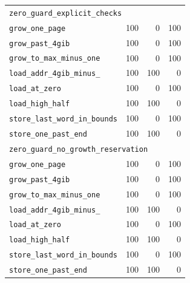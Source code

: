 {\begin{longtable}{lrrr}
\midrule
\multicolumn{4}{l}{\texttt{zero\_\allowbreak guard\_\allowbreak explicit\_\allowbreak checks}} \\
\quad \texttt{grow\_\allowbreak one\_\allowbreak page} & 100 & 0 & 100 \\
\quad \texttt{grow\_\allowbreak past\_\allowbreak 4gib} & 100 & 0 & 100 \\
\quad \texttt{grow\_\allowbreak to\_\allowbreak max\_\allowbreak minus\_\allowbreak one} & 100 & 0 & 100 \\
\quad \texttt{load\_\allowbreak addr\_\allowbreak 4gib\_\allowbreak minus\_\allowbreak 4} & 100 & 100 & 0 \\
\quad \texttt{load\_\allowbreak at\_\allowbreak zero} & 100 & 0 & 100 \\
\quad \texttt{load\_\allowbreak high\_\allowbreak half} & 100 & 100 & 0 \\
\quad \texttt{store\_\allowbreak last\_\allowbreak word\_\allowbreak in\_\allowbreak bounds} & 100 & 0 & 100 \\
\quad \texttt{store\_\allowbreak one\_\allowbreak past\_\allowbreak end} & 100 & 100 & 0 \\
\midrule
\multicolumn{4}{l}{\texttt{zero\_\allowbreak guard\_\allowbreak no\_\allowbreak growth\_\allowbreak reservation}} \\
\quad \texttt{grow\_\allowbreak one\_\allowbreak page} & 100 & 0 & 100 \\
\quad \texttt{grow\_\allowbreak past\_\allowbreak 4gib} & 100 & 0 & 100 \\
\quad \texttt{grow\_\allowbreak to\_\allowbreak max\_\allowbreak minus\_\allowbreak one} & 100 & 0 & 100 \\
\quad \texttt{load\_\allowbreak addr\_\allowbreak 4gib\_\allowbreak minus\_\allowbreak 4} & 100 & 100 & 0 \\
\quad \texttt{load\_\allowbreak at\_\allowbreak zero} & 100 & 0 & 100 \\
\quad \texttt{load\_\allowbreak high\_\allowbreak half} & 100 & 100 & 0 \\
\quad \texttt{store\_\allowbreak last\_\allowbreak word\_\allowbreak in\_\allowbreak bounds} & 100 & 0 & 100 \\
\quad \texttt{store\_\allowbreak one\_\allowbreak past\_\allowbreak end} & 100 & 100 & 0 \\
\end{longtable}
}
